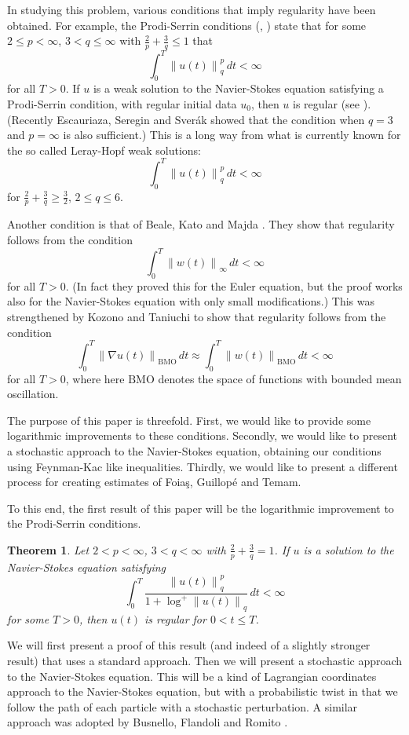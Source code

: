\documentclass[12pt]{amsart}
\newtheorem{thm}{Theorem}[section]
\theoremstyle{remark}
\newcommand{\snormo}[1]{{\mathopen\|#1\mathclose\|}}
\newcommand{\BMO}{\mathrm{BMO}}
\begin{document}
In studying this problem, various conditions that imply regularity
have been obtained.  For example, the 
Prodi-Serrin conditions (\cite{prodi}, \cite{serrin})
state that for some
$2 \le p < \infty$, $3<q\le\infty$ with
$\frac2p + \frac 3q \le 1$ that
$$ \int_0^T \snormo{u(t)}_q^p \, dt < \infty $$
for all $T>0$.
If $u$ is
a weak solution to the Navier-Stokes equation 
satisfying a Prodi-Serrin condition,
with regular initial
data $u_0$, then $u$ is regular (see \cite{sohr}).
(Recently Escauriaza, Seregin and Sver\'ak \cite{escauriaza et al}
showed that the condition when $q=3$ and $p=\infty$ is also sufficient.)
This is a long way from what is currently known for the so called Leray-Hopf 
weak
solutions:
$$ \int_0^T \snormo{u(t)}_q^p \, dt < \infty $$
for $\frac2p + \frac 3q \ge \frac32$, $2 \le q \le 6$.

Another condition is that of Beale, Kato and Majda
\cite{beale-kato-majda}.  They show that regularity
follows from the condition
$$ \int_0^T \snormo{w(t)}_\infty \, dt < \infty $$
for all $T > 0$.
(In fact they proved this for the Euler equation, but the
proof works also for the Navier-Stokes equation with only small modifications.)
This was strengthened by Kozono and Taniuchi 
\cite{kozono-taniuchi} to show that regularity follows
from the condition
$$ \int_0^T \snormo{\nabla u(t)}_\BMO \, dt \approx
   \int_0^T \snormo{w(t)}_\BMO \, dt < \infty $$
for all $T > 0$, where here $\BMO$ denotes the space of functions with bounded
mean oscillation.

The purpose of this paper is threefold.  First, we would like to provide some
logarithmic improvements to these conditions.  Secondly, we would like to
present a stochastic approach to the Navier-Stokes equation, obtaining
our conditions using Feynman-Kac like inequalities.  Thirdly, we would like
to present a different process for creating 
estimates of
Foia\c s, Guillop\'e and Temam.

To this end, the first result of this paper will be the logarithmic improvement
to the Prodi-Serrin conditions.

\begin{thm} \label{main prodi-serrin}
Let 
$2 < p < \infty$, $3<q < \infty$ with
$\frac2p+\frac3q=1$.
If $u$ is a solution to the Navier-Stokes equation satisfying
$$ \int_0^T \frac{\snormo{u(t)}_q^p}{1+\log^+\snormo{u(t)}_q}
   \, dt < \infty $$
for some $T>0$, 
then $u(t)$ 
is regular for $0 < t\le T$.
\end{thm}

We will first present a proof of this result (and indeed of
a slightly stronger result) that uses a standard approach.  
Then 
we will present a stochastic approach to the Navier-Stokes equation.
This will be a kind of Lagrangian coordinates approach to the
Navier-Stokes equation, but with a probabilistic twist in that we follow
the path of each particle with a stochastic perturbation.  A similar approach
was adopted by Busnello, Flandoli and Romito \cite{busnello et al}.
\end{document}
